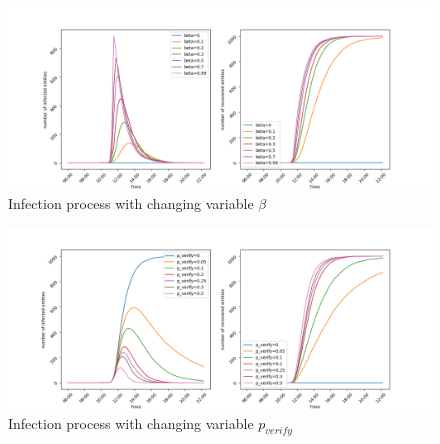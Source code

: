 \begin{figure}[!ht]
    \centering
    \includegraphics[scale=.5]{figs/eval/scenario1/beta_mix.png}
    \caption{Infection process with changing variable $\beta$}
    \label{scen1variablebeta} 
\end{figure}

\begin{figure}[!ht]
    \centering
    \includegraphics[scale=.5]{figs/eval/scenario1/verify_mix.png}
    \caption{Infection process with changing variable $p_{verify}$}
    \label{scen1variablepverify} 
\end{figure}


